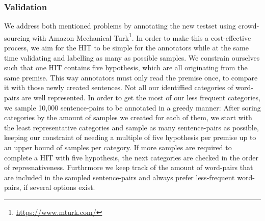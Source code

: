 \subsubsection{Validation}
We address both mentioned problems by annotating the new testset using crowd-sourcing with Amazon Mechanical Turk\footnote{\href{https://www.mturk.com/}{https://www.mturk.com/}}. In order to make this a cost-effective process, we aim for the \ac{HIT} to be simple for the annotators while at the same time validating and labelling as many as possible samples. We constrain ourselves such that one \ac{HIT} contains five hypothesis, which are all originating from the same premise. This way annotators must only read the premise once, to compare it with those newly created sentences. Not all our identiffied categories of word-pairs are well represented. In order to get the most of our less frequent categories, we sample 10,000 sentence-pairs to be annotated in a greedy manner: After soring categories by the amount of samples we created for each of them, we start with the least representative categories and sample as many sentence-pairs as possible, keeping our constraint of needing a multiple of five hypothesis per premise up to an upper bound of samples per category. If more samples are required to complete a \ac{HIT} with five hypothesis, the next categories are checked in the order of represnativeness. Furthrmore we keep track of the amount of word-pairs that are included in the sampled sentence-pairs and always prefer less-frequent word-pairs, if several options exist.
